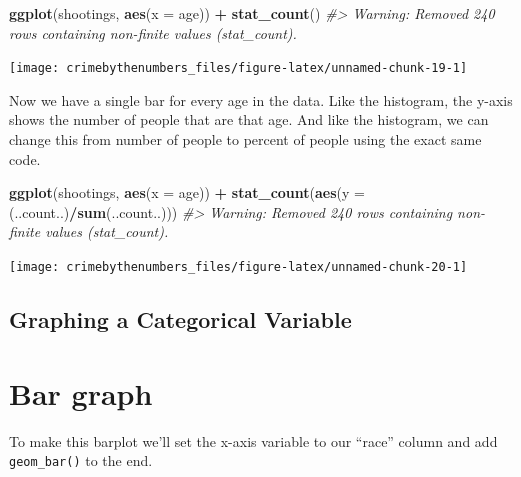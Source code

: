 \documentclass[
  12pt,
]{book}
\newenvironment{Shaded}{\begin{snugshade}}{\end{snugshade}}
\newcommand{\CommentTok}[1]{\textcolor[rgb]{0.37,0.37,0.37}{\textit{#1}}}
\newcommand{\DataTypeTok}[1]{\textcolor[rgb]{0.27,0.27,0.27}{#1}}
\newcommand{\KeywordTok}[1]{\textcolor[rgb]{0.27,0.27,0.27}{\textbf{#1}}}
\newcommand{\NormalTok}[1]{#1}
\newcommand{\OperatorTok}[1]{\textcolor[rgb]{0.43,0.43,0.43}{\textbf{#1}}}
\newcommand{\StringTok}[1]{\textcolor[rgb]{0.5,0.5,0.5}{#1}}
\begin{document}
\begin{Shaded}
\begin{Highlighting}[]
\KeywordTok{ggplot}\NormalTok{(shootings, }\KeywordTok{aes}\NormalTok{(}\DataTypeTok{x =}\NormalTok{ age)) }\OperatorTok{+}\StringTok{ }
\StringTok{  }\KeywordTok{stat\_count}\NormalTok{()}
\CommentTok{\#> Warning: Removed 240 rows containing non{-}finite values (stat\_count).}
\end{Highlighting}
\end{Shaded}

\begin{center}\texttt{[image: crimebythenumbers\_files/figure-latex/unnamed-chunk-19-1]} \end{center}

Now we have a single bar for every age in the data. Like the histogram, the y-axis shows the number of people that are that age. And like the histogram, we can change this from number of people to percent of people using the exact same code.

\begin{Shaded}
\begin{Highlighting}[]
\KeywordTok{ggplot}\NormalTok{(shootings, }\KeywordTok{aes}\NormalTok{(}\DataTypeTok{x =}\NormalTok{ age)) }\OperatorTok{+}\StringTok{ }
\StringTok{  }\KeywordTok{stat\_count}\NormalTok{(}\KeywordTok{aes}\NormalTok{(}\DataTypeTok{y =}\NormalTok{ (..count..)}\OperatorTok{/}\KeywordTok{sum}\NormalTok{(..count..)))}
\CommentTok{\#> Warning: Removed 240 rows containing non{-}finite values (stat\_count).}
\end{Highlighting}
\end{Shaded}

\begin{center}\texttt{[image: crimebythenumbers\_files/figure-latex/unnamed-chunk-20-1]} \end{center}

\hypertarget{graphing-a-categorical-variable}{%
\subsection{Graphing a Categorical Variable}\label{graphing-a-categorical-variable}}

\hypertarget{bar-graph}{%
\section{Bar graph}\label{bar-graph}}

To make this barplot we'll set the x-axis variable to our ``race'' column and add \texttt{geom\_bar()} to the end.
\end{document}
